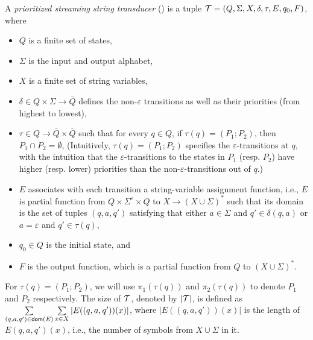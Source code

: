 \begin{definition}
A \emph{prioritized streaming string transducer} (\PSST) is a tuple $\mathcal{T} = (Q, \Sigma, X, \delta, \tau, E, q_0, F)$, where 
\begin{itemize}
\item $Q$ is a finite set of states, 
\item $\Sigma$ is the input and output alphabet, 
\item $X$ is a finite set of string variables, 
\item $\delta \in Q \times \Sigma \rightarrow \overline{Q}$ defines the non-$\varepsilon$ transitions as well as their priorities (from highest to lowest),
% 
\item $\tau \in Q \rightarrow \overline{Q} \times \overline{Q}$ such that for every $q \in Q$, if $\tau(q) = (P_1; P_2)$, then $P_1 \cap P_2 = \emptyset$, (Intuitively, $\tau(q)=(P_1; P_2)$ specifies the $\varepsilon$-transitions at $q$, with the intuition that the $\varepsilon$-transitions to the states in $P_1$ (resp. $P_2$) have higher (resp. lower) priorities than the non-$\varepsilon$-transitions out of $q$.)
\item $E$ associates with each transition a string-variable assignment function, i.e., $E$ is partial function from $Q \times \Sigma^\varepsilon \times
  Q$ to $X \rightarrow (X \cup \Sigma)^{\ast}$ such that its domain is the set of tuples $(q, a, q')$ satisfying that either $a \in \Sigma$ and $q' \in \delta(q, a)$ or $a = \varepsilon$ and $q' \in \tau(q)$,
\item  $q_0 \in Q$ is the initial state, and
\item  $F$ is the output function, which is a partial function from $Q$ to $(X \cup \Sigma)^{\ast}$.
\end{itemize}
\end{definition}
For $\tau(q)=(P_1; P_2)$, we will use $\pi_1(\tau(q))$ and $\pi_2(\tau(q))$ to denote $P_1$ and $P_2$ respectively.  
The size of $\mathcal{T}$, denoted by $|\mathcal{T}|$, is defined as $\sum \limits_{(q, a, q') \in \mathsf{dom}(E)} \sum \limits_{x \in X} |E((q, a, q'))(x)|$, where $|E((q, a, q'))(x)|$ is the length of $E(q, a, q')(x)$, i.e., the number of symbols from $X \cup \Sigma$ in it.

